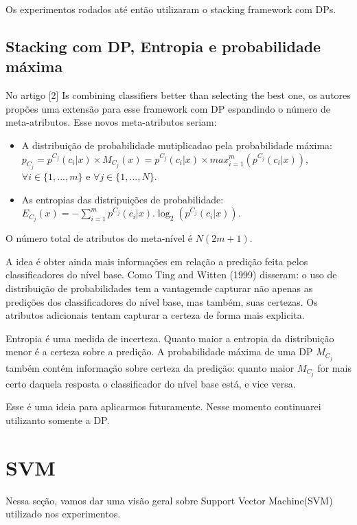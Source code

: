 \documentclass[]{article}
\begin{document}
Os experimentos rodados até então utilizaram o stacking framework com
DPs.

\subsection{Stacking com DP, Entropia e probabilidade
máxima}\label{stacking-com-dp-entropia-e-probabilidade-maxima}

No artigo {[}2{]} Is combining classifiers better than selecting the
best one, os autores propões uma extensão para esse framework com DP
espandindo o número de meta-atributos. Esse novos meta-atributos seriam:

\begin{itemize}
\item
  A distribuição de probabilidade mutiplicadao pela probabilidade
  máxima:
  \(p_{C_j} = p^{C_j}(c_i|x) \times M_{C_j}(x) = p^{C_j}(c_i|x) \times max_{i=1}^{m}(p^{C_j}(c_i|x))\),
  \(\forall i \in \{1,...,m\}\) e \(\forall j \in \{1,...,N\}\).
\item
  As entropias das distripuições de probabilidade:
  \(E_{C_j}(x) = -\sum_{i=1}^{m}p^{C_j}(c_i|x).\log_2(p^{C_j}(c_i|x))\).
\end{itemize}

O número total de atributos do meta-nível é \(N(2m+1)\).

A idea é obter ainda mais informações em relação a predição feita pelos
classificadores do nível base. Como Ting and Witten (1999) disseram: o
uso de distribuição de probabilidades tem a vantagemde capturar não
apenas as predições dos classificadores do nível base, mas também, suas
certezas. Os atributos adicionais tentam capturar a certeza de forma
mais explicita.

Entropia é uma medida de incerteza. Quanto maior a entropia da
distribuição menor é a certeza sobre a predição. A probabilidade máxima
de uma DP \(M_{C_j}\) também contém informação sobre certeza da
predição: quanto maior \(M_{C_j}\) for mais certo daquela resposta o
classificador do nível base está, e vice versa.

Esse é uma ideia para aplicarmos futuramente. Nesse momento continuarei
utilizanto somente a DP.

\section{SVM}\label{svm}

Nessa seção, vamos dar uma visão geral sobre Support Vector Machine(SVM)
utilizado nos experimentos.
\end{document}
